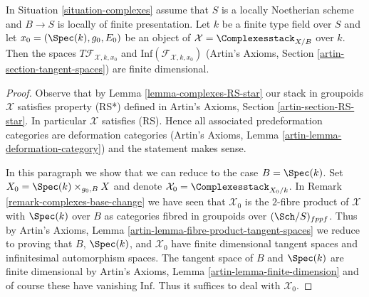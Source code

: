 \begin{lemma}
\label{lemma-complexes-tangent-space}
In Situation \ref{situation-complexes} assume that $S$ is a locally Noetherian
scheme and $B \to S$ is locally of finite presentation.
Let $k$ be a finite type field over $S$ and let
$x_0 = (\Spec(k), g_0, E_0)$
be an object of $\mathcal{X} = \Complexesstack_{X/B}$ over $k$.
Then the spaces $T\mathcal{F}_{\mathcal{X}, k, x_0}$ and
$\text{Inf}(\mathcal{F}_{\mathcal{X}, k, x_0})$
(Artin's Axioms, Section \ref{artin-section-tangent-spaces})
are finite dimensional.
\end{lemma}

\begin{proof}
Observe that by Lemma \ref{lemma-complexes-RS-star}
our stack in groupoids $\mathcal{X}$ satisfies property (RS*)
defined in Artin's Axioms, Section \ref{artin-section-RS-star}.
In particular $\mathcal{X}$ satisfies (RS).
Hence all associated predeformation
categories are deformation categories
(Artin's Axioms, Lemma \ref{artin-lemma-deformation-category})
and the statement makes sense.

\medskip\noindent
In this paragraph we show that we can reduce to the case $B = \Spec(k)$.
Set $X_0 = \Spec(k) \times_{g_0, B} X$
and denote $\mathcal{X}_0 = \Complexesstack_{X_0/k}$. In
Remark \ref{remark-complexes-base-change} we have seen that
$\mathcal{X}_0$ is the $2$-fibre product of $\mathcal{X}$ with
$\Spec(k)$ over $B$ as categories fibred in groupoids over
$(\Sch/S)_{fppf}$. Thus by
Artin's Axioms, Lemma \ref{artin-lemma-fibre-product-tangent-spaces}
we reduce to proving that $B$, $\Spec(k)$, and $\mathcal{X}_0$
have finite dimensional tangent spaces and infinitesimal automorphism
spaces. The tangent space of $B$ and $\Spec(k)$ are finite dimensional by
Artin's Axioms, Lemma \ref{artin-lemma-finite-dimension}
and of course these have vanishing $\text{Inf}$.
Thus it suffices to deal with $\mathcal{X}_0$.


\end{proof}
